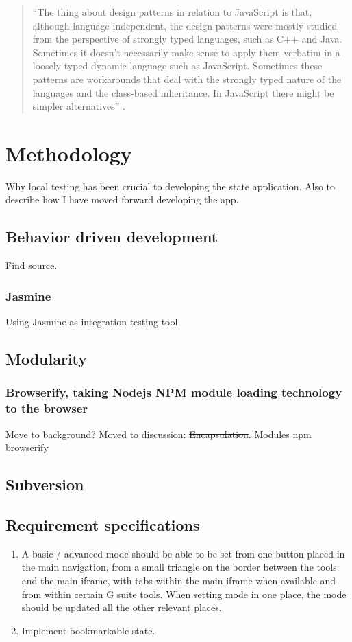 \documentclass[english]{ifimaster}
\begin{document}
\begin{quotation}
“The thing about design patterns in relation to JavaScript is that, although language-independent, the design patterns were mostly studied from the perspective of strongly typed languages, such as C++ and Java. Sometimes it doesn’t necessarily make sense to apply them verbatim in a loosely typed dynamic language such as JavaScript. Sometimes these patterns are workarounds that deal with the strongly typed nature of the languages and the class-based inheritance. In JavaScript there might be simpler alternatives” \parencite[s. 2]{stefanov}.
\end{quotation}

\chapter{Methodology}
Why local testing has been crucial to developing the state application. Also to describe how I have moved forward developing the app.

\section{Behavior driven development}
Find source.

\subsection{Jasmine}
Using Jasmine as integration testing tool

\section{Modularity}
\subsection{Browserify, taking Nodejs NPM module loading technology to the browser}
Move to background?
Moved to discussion: \sout {Encapsulation}.
Modules
npm
browserify

\section{Subversion}

\section{Requirement specifications}
\begin{enumerate}
\item A basic / advanced mode should be able to be set from one button placed in the main navigation, from a small triangle on the border between the tools and the main iframe, with tabs within the main iframe when available and from within certain G suite tools. When setting mode in one place, the mode should be updated all the other relevant places.

\item Implement bookmarkable state.

\end{enumerate}
\end{document}
